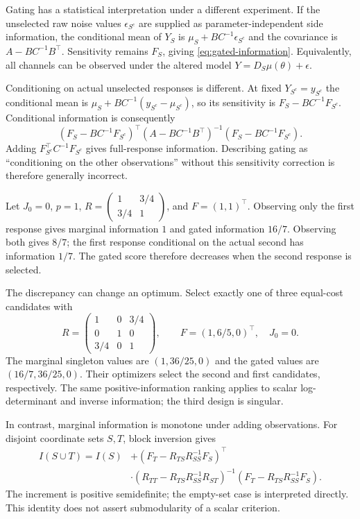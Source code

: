 Gating has a statistical interpretation under a different experiment. If the
unselected raw noise values $\epsilon_{S^c}$ are supplied as
parameter-independent side information, the conditional mean of $Y_S$ is
$\mu_S+BC^{-1}\epsilon_{S^c}$ and the covariance is
$A-BC^{-1}B^\top$. Sensitivity remains $F_S$, giving
\eqref{eq:gated-information}. Equivalently, all channels can be observed
under the altered model $Y=D_S\mu(\theta)+\epsilon$.

Conditioning on actual unselected responses is different. At fixed
$Y_{S^c}=y_{S^c}$ the conditional mean is
$\mu_S+BC^{-1}(y_{S^c}-\mu_{S^c})$, so its sensitivity is
$F_S-BC^{-1}F_{S^c}$. Conditional information is consequently
\begin{equation}
 (F_S-BC^{-1}F_{S^c})^\top(A-BC^{-1}B^\top)^{-1}
 (F_S-BC^{-1}F_{S^c}).
 \label{eq:conditional-information}
\end{equation}
Adding $F_{S^c}^\top C^{-1}F_{S^c}$ gives full-response information.
Describing gating as ``conditioning on the other observations'' without
this sensitivity correction is therefore generally incorrect.

\begin{example}
\label{ex:gating-witnesses}
Let $J_0=0$, $p=1$, $R=\left(\begin{smallmatrix}1&3/4\\3/4&1\end{smallmatrix}\right)$,
and $F=(1,1)^\top$. Observing only the first response gives marginal
information $1$ and gated information $16/7$. Observing both gives $8/7$;
the first response conditional on the actual second has information $1/7$.
The gated score therefore decreases when the second response is selected.

The discrepancy can change an optimum. Select exactly one of three equal-cost
candidates with
\[
 R=\begin{pmatrix}1&0&3/4\\0&1&0\\3/4&0&1\end{pmatrix},\qquad
 F=(1,6/5,0)^\top,\quad J_0=0.
\]
The marginal singleton values are $(1,36/25,0)$ and the gated values are
$(16/7,36/25,0)$. Their optimizers select the second and first candidates,
respectively. The same positive-information ranking applies to scalar
log-determinant and inverse information; the third design is singular.
\end{example}
In contrast, marginal information is monotone under adding observations.
For disjoint coordinate sets $S,T$, block inversion gives
\begin{equation}
 \begin{split}
 I(S\cup T)=I(S)&+(F_T-R_{TS}R_{SS}^{-1}F_S)^\top\\
 &\cdot(R_{TT}-R_{TS}R_{SS}^{-1}R_{ST})^{-1}
 (F_T-R_{TS}R_{SS}^{-1}F_S).
 \end{split}
 \label{eq:information-increment}
\end{equation}
The increment is positive semidefinite; the empty-set case is interpreted
directly. This identity does not assert submodularity of a scalar criterion.

